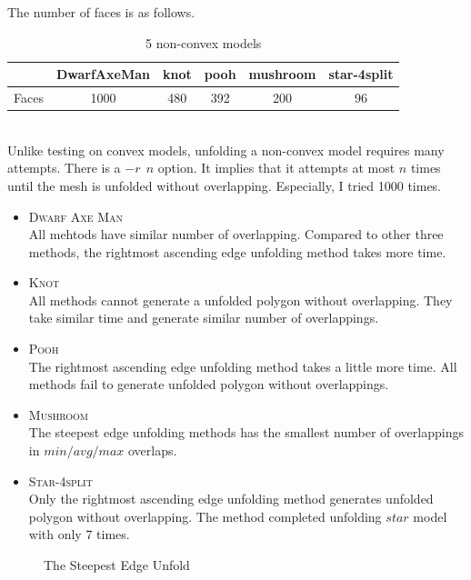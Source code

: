 \documentclass[11pt, letterpaper]{article}
\begin{document}
The number of faces is as follows.
\begin{table}[th]
\centering
\caption{5 non-convex models}
\label{table:nonconvex}
\begin{tabular}{@{}cccccc@{}}
\toprule
      & DwarfAxeMan & knot & pooh & mushroom & star-4split \\ \midrule
Faces & 1000        & 480  & 392  & 200      & 96          \\ \bottomrule
\end{tabular}
\end{table}
\\
Unlike testing on convex models, unfolding a non-convex model requires many attempts. There is a $-r \ \ n$ option. It implies that it attempts at most $n$ times until the mesh is unfolded without overlapping. Especially, I tried 1000 times.


\begin{itemize}
	\item \textsc{Dwarf Axe Man}
	\\All mehtods have similar number of overlapping. Compared to other three methods, the rightmost ascending edge unfolding method takes more time.
	\item \textsc{Knot}
	\\All methods cannot generate a unfolded polygon without overlapping. They take similar time and generate similar number of overlappings.
	\item \textsc{Pooh}
	\\The rightmost ascending edge unfolding method takes a little more time. All methods fail to generate unfolded polygon without overlappings.
	\item \textsc{Mushroom}
	\\The steepest edge unfolding methods has the smallest number of overlappings in $min/avg/max$ overlaps.
	\item \textsc{Star-4split}
	\\Only the rightmost ascending edge unfolding method generates unfolded polygon without overlapping. The method completed unfolding $star$ model with only 7 times.
\end{itemize}

	
\begin{figure}[th]
\centering
{}
\hspace{5mm}
\hspace{5mm}
\hspace{5mm}
\hspace{5mm}
\caption{The Steepest Edge Unfold}
\end{figure}
\end{document}
